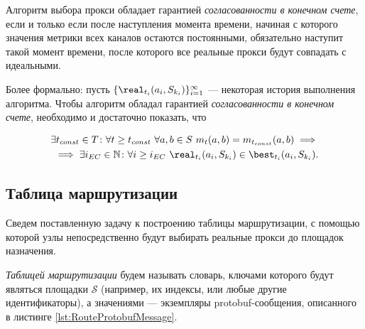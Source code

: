 \begin{definition}
\label{EventualConsistencyDefinition}
    Алгоритм выбора прокси обладает гарантией \textit{согласованности в конечном счете}, если и только если после наступления момента времени, начиная с которого значения метрики всех каналов остаются постоянными, обязательно наступит такой момент времени, после которого все реальные прокси будут совпадать с идеальными.
\end{definition}

Более формально: пусть $\{\real_{t_i}(a_i, S_{k_i})\}_{i = 1}^{\infty}$ --- некоторая история выполнения алгоритма. Чтобы алгоритм обладал гарантией \textit{согласованности в конечном счете}, необходимо и достаточно показать, что 

\begin{equation}
\begin{aligned}
    \exists t_{const} \in T \colon \forall t \geq t_{const}\ \forall a, b \in S\ m_t(a, b) = m_{t_{const}}(a, b) \implies \\
    \implies \exists i_{EC} \in \mathbb{N} \colon \forall i \geq i_{EC}\ {\real}_{t_i}(a_i, S_{k_i}) \in {\best}_{t_i}(a_i, S_{k_i}).
\end{aligned}
\end{equation}

\subsection{Таблица маршрутизации}

Сведем поставленную задачу к построению таблицы маршрутизации, с помощью которой узлы непосредственно будут выбирать реальные прокси до площадок назначения.

\begin{definition}
    \textit{Таблицей маршрутизации} будем называть словарь, ключами которого будут являться площадки $\mathcal{S}$ (например, их индексы, или любые другие идентификаторы), а значениями --- экземпляры protobuf-сообщения, описанного в листинге \ref{lst:RouteProtobufMessage}.
\end{definition}
    
    
